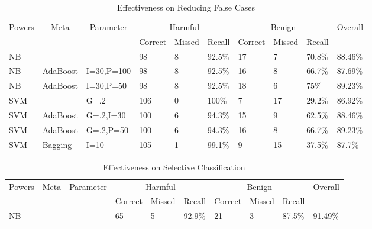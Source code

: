 \documentclass[nocopyrightspace]{sigplanconf}
\begin{document}
\begin{table}[htb!]
\centering
\begin{tabularx}{\textwidth}{|X|X|X|X|X|X|X|X|X|X|}
\hline
\multicolumn{1}{|c|}{\multirow{2}{*}{Powers}} & 
\multicolumn{1}{|c|}{\multirow{2}{*}{Meta}} & 
\multicolumn{1}{|c|}{\multirow{2}{*}{Parameter}} & 
\multicolumn{3}{|c|}{Harmful} & 
\multicolumn{3}{|c|}{Benign} & 
\multicolumn{1}{|c|}{\multirow{2}{*}{Overall}} \\
\cline{4-9}

& & & Correct & Missed & Recall & Correct & Missed & Recall & \\
\hline
NB &  &  & 98 & 8 & 92.5\% & 17 & 7 & 70.8\% & 88.46\% \\ 
\hline 
NB & AdaBoost & I=30,P=100 & 98 & 8 & 92.5\% & 16 & 8 & 66.7\% & 87.69\%\\ 
\hline 
NB & AdaBoost & I=30,P=50 & 98 & 8 & 92.5\% & 18 & 6 & 75\% & 89.23\% \\ 
\hline 
SVM &  & G=.2 & 106 & 0 & 100\% & 7 & 17 & 29.2\% & 86.92\%\\ 
\hline 
SVM & AdaBoost & G=.2,I=30 & 100 & 6 & 94.3\% & 15 & 9 & 62.5\% & 88.46\%\\ 
\hline 
SVM & AdaBoost & G=.2,P=50 & 100 & 6 & 94.3\% & 16 & 8 & 66.7\% & 89.23\%\\ 
\hline 
SVM & Bagging & I=10 & 105 & 1 & 99.1\% & 9 & 15 & 37.5\% & 87.7\%\\
\hline
\end{tabularx}
\caption{Effectiveness on Reducing False Cases}
\label{tab:dataset2}
\end{table}

\begin{table}[htb!]
\centering
\begin{tabularx}{\textwidth}{|X|X|X|X|X|X|X|X|X|X|}
\hline
\multicolumn{1}{|c|}{\multirow{2}{*}{Powers}} & 
\multicolumn{1}{|c|}{\multirow{2}{*}{Meta}} & 
\multicolumn{1}{|c|}{\multirow{2}{*}{Parameter}} & 
\multicolumn{3}{|c|}{Harmful} & 
\multicolumn{3}{|c|}{Benign} & 
\multicolumn{1}{|c|}{\multirow{2}{*}{Overall}} \\
\cline{4-9}

& & & Correct & Missed & Recall & Correct & Missed & Recall & \\
\hline
NB & & & 65 & 5 & 92.9\% & 21 & 3 & 87.5\% & 91.49\% \\
\hline
\end{tabularx}
\caption{Effectiveness on Selective Classification}
\label{tab:dataset3}
\end{table}
\end{document}
